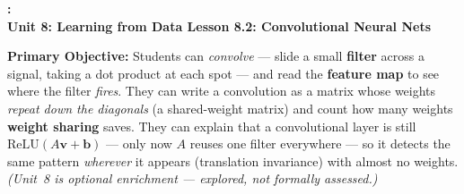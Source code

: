 \documentclass[10pt]{article}
\newcommand{\vv}{\mathbf{v}}
\newcommand{\bb}{\mathbf{b}}
\newcommand{\relu}{\mathrm{ReLU}}
\newcommand{\UnitNumberName}{Unit 8: Learning from Data \quad}
\newcommand{\LessonNumberName}{Lesson 8.2: Convolutional Neural Nets}
\begin{document}
\begin{center}
    {\Large\bfseries \CourseName: \SchoolYear \\
    {\small\bfseries \UnitNumberName \LessonNumberName}}
\end{center}

\begin{tcolorbox}[colback=blush, colframe=burgundy, boxrule=0.9pt, arc=2mm,
    left=2mm, right=2mm, top=1.5mm, bottom=1.5mm]
    \textbf{Primary Objective:} Students can \emph{convolve} --- slide a small \textbf{filter} across a signal,
    taking a dot product at each spot --- and read the \textbf{feature map} to see where the filter
    \emph{fires}. They can write a convolution as a matrix whose weights \emph{repeat down the diagonals} (a
    shared-weight matrix) and count how many weights \textbf{weight sharing} saves. They can explain that a
    convolutional layer is still $\relu(A\vv+\bb)$ --- only now $A$ reuses one filter everywhere --- so it
    detects the same pattern \emph{wherever} it appears (translation invariance) with almost no weights.
    \emph{(Unit~8 is optional enrichment --- explored, not formally assessed.)}
\end{tcolorbox}
\end{document}
